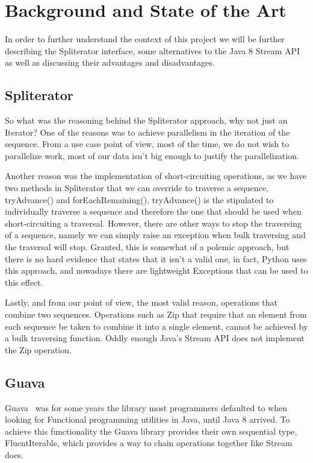 \chapter{Background and State of the Art}

In order to further understand the context of this project we will be further describing the Spliterator interface, some alternatives to the Java 8 Stream API as well as discussing their advantages and disadvantages.

\section{Spliterator}

So what was the reasoning behind the Spliterator approach, why not just an Iterator?
One of the reasons was to achieve parallelism in the iteration of the sequence. From a use case point of view, most of the time, we do not wish to parallelize work, most of our data isn't big enough to justify the parallelization.

Another reason was the implementation of short-circuiting operations, as we have two methods in Spliterator that we can override to traverse a sequence, tryAdvance() and forEachRemaining(), tryAdvance() is the stipulated to individually traverse a sequence and therefore the one that should be used when short-circuiting a traversal.
However, there are other ways to stop the traversing of a sequence, namely we can simply raise an exception when bulk traversing and the traversal will stop. Granted, this is somewhat of a polemic approach, but there is no hard evidence that states that it isn't a valid one, in fact, Python uses this approach, and nowadays there are lightweight Exceptions that can be used to this effect.

Lastly, and from our point of view, the most valid reason, operations that combine two sequences. Operations such as Zip that require that an element from each sequence be taken to combine it into a single element, cannot be achieved by a bulk traversing function. Oddly enough Java's Stream API does not implement the Zip operation.


\section{Guava}

Guava~\citep{guava} was for some years the library most programmers defaulted to when looking for Functional programming utilities in Java, until Java 8 arrived. To achieve this functionality the Guava library provides their own sequential type, FluentIterable, which provides a way to chain operations together like Stream does.

